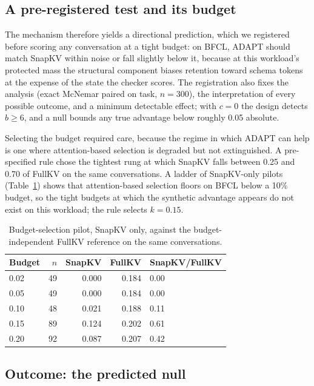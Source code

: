 \subsection{A pre-registered test and its budget}
\label{sec:external-prereg}

The mechanism therefore yields a directional prediction, which we registered
before scoring any conversation at a tight budget: on BFCL, ADAPT should match
SnapKV within noise or fall slightly below it, because at this workload's
protected mass the structural component biases retention toward schema tokens at
the expense of the state the checker scores.  The registration also fixes the
analysis (exact McNemar paired on task, $n=300$), the interpretation of every
possible outcome, and a minimum detectable effect; with $c=0$ the design detects
$b\ge6$, and a null bounds any true advantage below roughly 0.05 absolute.

Selecting the budget required care, because the regime in which ADAPT can help
is one where attention-based selection is degraded but not extinguished.  A
pre-specified rule chose the tightest rung at which SnapKV falls between 0.25 and
0.70 of FullKV on the same conversations.  A ladder of SnapKV-only pilots
(Table~\ref{tab:ladder}) shows that attention-based selection floors on BFCL
below a 10\% budget, so the tight budgets at which the synthetic advantage
appears do not exist on this workload; the rule selects $k=0.15$.

\begin{table}[!htbp]
  \centering
  \caption{Budget-selection pilot, SnapKV only, against the budget-independent
  FullKV reference on the same conversations.}
  \label{tab:ladder}
  \begin{tabular}{lrrrl}
    \toprule
    Budget & $n$ & SnapKV & FullKV & SnapKV/FullKV \\
    \midrule
    0.02 & 49 & 0.000 & 0.184 & 0.00 \\
    0.05 & 49 & 0.000 & 0.184 & 0.00 \\
    0.10 & 48 & 0.021 & 0.188 & 0.11 \\
    0.15 & 89 & 0.124 & 0.202 & 0.61 \\
    0.20 & 92 & 0.087 & 0.207 & 0.42 \\
    \bottomrule
  \end{tabular}
\end{table}

\subsection{Outcome: the predicted null}
\label{sec:external-outcome}

